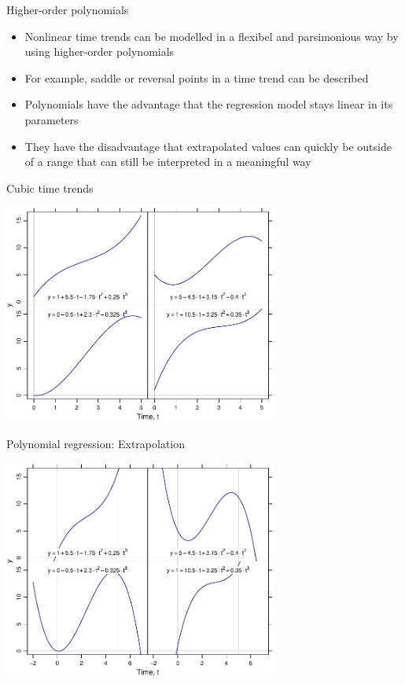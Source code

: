 \documentclass[aspectratio=169]{beamer}
\begin{document}
\begin{frame}{Higher-order polynomials}
  \begin{itemize}
    \item Nonlinear time trends can be modelled in a flexibel and parsimonious
      way by using higher-order polynomials
    \item For example, saddle or reversal points in a time trend can be
      described
    \item Polynomials have the advantage that the regression model stays linear
      in its parameters
    \item They have the disadvantage that extrapolated values can quickly be
      outside of a range that can still be interpreted in a meaningful way
  \end{itemize}
\end{frame}


\begin{frame}{Cubic time trends}
\begin{center}
\includegraphics[width=9cm]{../figures/cubic}
\end{center}
\end{frame}


\begin{frame}{Polynomial regression: Extrapolation}
\begin{center}
\includegraphics[width=9cm]{../figures/cubic-gone-bad}
\end{center}
\end{frame}
\end{document}
